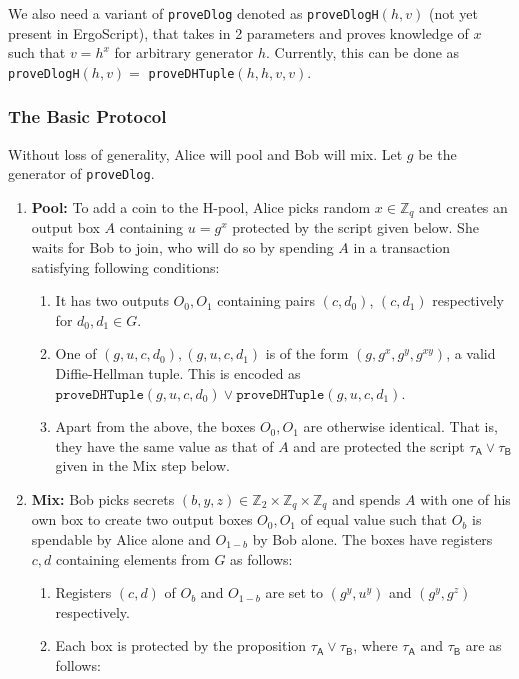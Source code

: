\documentclass[11pt]{article}
\newcommand{\langname}{ErgoScript\xspace}
\begin{document}
We also need a variant of \texttt{proveDlog} denoted as \texttt{proveDlogH}$(h, v)$ (not yet present in \langname), that takes in 2 parameters and proves knowledge of $x$ such that $v = h^x$ for arbitrary generator $h$. Currently, this can be done as \texttt{proveDlogH}$(h, v) = $ \texttt{proveDHTuple}$(h, h, v, v)$.
 
\subsubsection{The Basic Protocol}
Without loss of generality, Alice will pool and Bob will mix. 
Let $g$ be the generator of \texttt{proveDlog}.
\begin{enumerate}
	\item \textbf{Pool:} To add a coin to the H-pool, Alice picks random $x\in \mathbb{Z}_q$ and creates an output box $A$ containing $u = g^x$ protected by the script given below. She waits for Bob to join, who will do so by spending $A$ in a transaction satisfying following conditions: 
	
	\begin{enumerate}
		\item It has two outputs $O_0, O_1$ containing pairs $(c, d_0)$, $(c, d_1)$ respectively for $d_0, d_1\in G$. 
		\item One of $(g, u, c, d_0), (g, u, c, d_1)$ is of the form $(g, g^x, g^y, g^{xy})$, a valid Diffie-Hellman tuple. This is encoded as $\texttt{proveDHTuple}(g, u, c, d_0)\lor \texttt{proveDHTuple}(g, u, c, d_1)$.
		\item Apart from the above, the boxes $O_0, O_1$ are otherwise identical. That is, they have the same value as that of $A$ and are protected the script $\tau_\textsf{A} \lor \tau_\textsf{B}$ given in the Mix step below.
	\end{enumerate}
	
	
	\item \textbf{Mix:} Bob picks secrets $(b, y, z) \in \mathbb{Z}_2\times \mathbb{Z}_q\times\mathbb{Z}_q$ and spends $A$ with one of his own box to create two output boxes $O_0, O_1$ of equal value such that $O_b$ is spendable by Alice alone and $O_{1-b}$ by Bob alone. 
	The boxes have registers $c, d$ containing elements from $G$ as follows: 
	\begin{enumerate}
		\item %
		Registers $(c, d)$ of $O_b$ and $O_{1-b}$ are set to $(g^y, u^y)$ and $(g^y, g^z)$ respectively. 
		\item Each box is protected by the proposition $\tau_\textsf{A} \lor \tau_\textsf{B}$, where $\tau_\textsf{A}$ and $\tau_\textsf{B}$ are as follows: 
		

\end{enumerate}
\end{enumerate}
\end{document}
